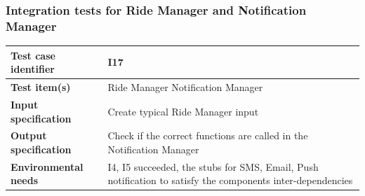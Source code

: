 \documentclass[a4paper,11pt]{report} %
\begin{document}
		\subsubsection{Integration tests for Ride Manager and Notification Manager} \label{sec:3.1.14}
			\begin{minipage}{\linewidth}
			\end{minipage}		
		\begin{center}
			\renewcommand{\arraystretch}{1.2}
			\setlength{\tabcolsep}{24pt}
			\begin{tabular}{ l  p{9cm}}\hline
				\textbf{Test case identifier} & I17\\\hline
				\textbf{Test item(s)} & Ride Manager \textrightarrow Notification Manager\\\hline
				\textbf{Input specification} & Create typical Ride Manager input \\\hline
				\textbf{Output specification} & Check if the correct functions are called in the Notification Manager\\\hline
				\textbf{Environmental needs} & I4, I5 succeeded, the stubs for SMS, Email, Push notification to satisfy the components inter-dependencies\\\hline
			\end{tabular}
		\end{center}
		
		\bigskip
\end{document}

